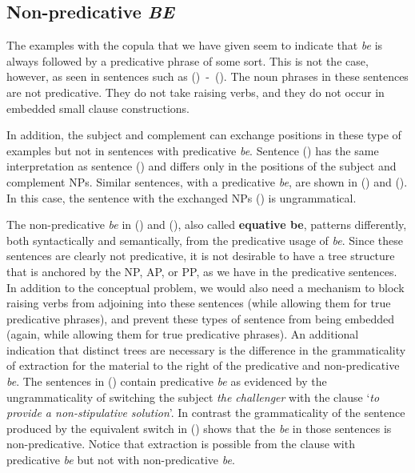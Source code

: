 \subsection{Non-predicative {\it BE}}

The examples with the copula that we have given seem to indicate that {\it be}
is always followed by a predicative phrase of some sort.  This is not the case,
however, as seen in sentences such as ({})~-~({}).  The noun phrases in
these sentences are not predicative.  They do not take raising verbs, and they
do not occur in embedded small clause constructions.




In addition, the subject and complement can exchange positions in these type of
examples but not in sentences with predicative {\it be}.  Sentence ({})
has the same interpretation as sentence ({}) and differs only in the
positions of the subject and complement NPs. Similar sentences, with a
predicative {\it be}, are shown in ({}) and ({}).  In this case,
the sentence with the exchanged NPs ({}) is ungrammatical.


The non-predicative {\it be} in ({}) and ({}), also called {\bf
equative be}, patterns differently, both syntactically and semantically, from
the predicative usage of {\it be}.  Since these sentences are clearly not
predicative, it is not desirable to have a tree structure that is anchored by
the NP, AP, or PP, as we have in the predicative sentences.  In addition to the
conceptual problem, we would also need a mechanism to block raising verbs from
adjoining into these sentences (while allowing them for true predicative
phrases), and prevent these types of sentence from being embedded (again, while
allowing them for true predicative phrases).  An additional indication that
distinct trees are necessary is the difference in the grammaticality of
extraction for the material to the right of the predicative and non-predicative
{\it be}.  The sentences in ({}) contain predicative {\it be} as
evidenced by the ungrammaticality of switching the subject {\it the challenger}
with the clause `{\it to provide a non-stipulative solution}'. In contrast the
grammaticality of the sentence produced by the equivalent switch in ({})
shows that the {\it be} in those sentences is non-predicative. Notice that
extraction is possible from the clause with predicative {\it be} but not with
non-predicative {\it be}.

